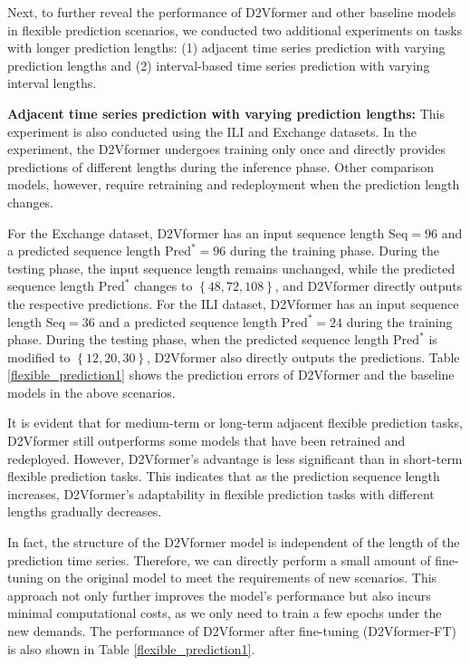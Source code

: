 \documentclass{article}
\begin{document}
Next, to further reveal the performance of D2Vformer and other baseline models in flexible prediction scenarios, we conducted two additional experiments on tasks with longer prediction lengths: (1) adjacent time series prediction with varying prediction lengths and (2) interval-based time series prediction with varying interval lengths.



\textbf{Adjacent time series prediction with varying prediction lengths:} 
This experiment is also conducted using the ILI and Exchange datasets. 
In the experiment, the D2Vformer undergoes training only once and directly provides predictions of different lengths during the inference phase. 
Other comparison models, however, require retraining and redeployment when the prediction length changes.

For the Exchange dataset, D2Vformer has an input sequence length $\text{Seq}=96$ and a predicted sequence length $\text{Pred}^*=96$ during the training phase. During the testing phase, the input sequence length remains unchanged, while the predicted sequence length $\text{Pred}^*$ changes to $\left\{48, 72, 108\right\}$, and D2Vformer directly outputs the respective predictions.
For the ILI dataset, D2Vformer has an input sequence length $\text{Seq}=36$ and a predicted sequence length $\text{Pred}^*=24$ during the training phase. During the testing phase, when the predicted sequence length $\text{Pred}^*$ is modified to $\left\{12, 20, 30\right\}$, D2Vformer also directly outputs the predictions. Table \ref{flexible_prediction1} shows the prediction errors of D2Vformer and the baseline models in the above scenarios.

It is evident that for medium-term or long-term adjacent flexible prediction tasks, D2Vformer still outperforms some models that have been retrained and redeployed. However, D2Vformer's advantage is less significant than in short-term flexible prediction tasks. This indicates that as the prediction sequence length increases, D2Vformer's adaptability in flexible prediction tasks with different lengths gradually decreases.

In fact, the structure of the D2Vformer model is independent of the length of the prediction time series. Therefore, we can directly perform a small amount of fine-tuning on the original model to meet the requirements of new scenarios. This approach not only further improves the model's performance but also incurs minimal computational costs, as we only need to train a few epochs under the new demands. The performance of D2Vformer after fine-tuning (D2Vformer-FT) is also shown in Table \ref{flexible_prediction1}.
\end{document}
